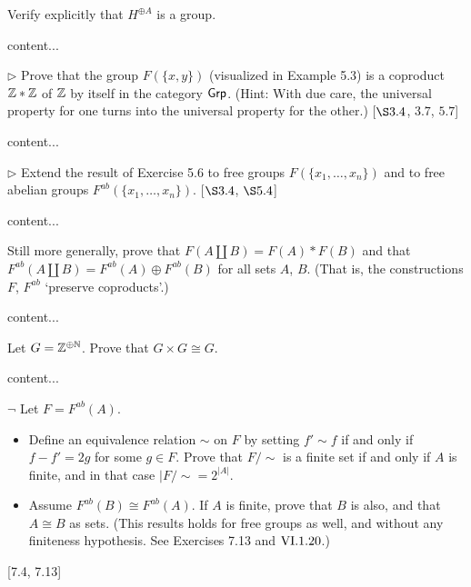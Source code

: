 \begin{exercise}
	Verify explicitly that $H^{\oplus A}$ is a group. 
\end{exercise}
\begin{solution}
	content...
\end{solution}

\begin{exercise}
	$\triangleright$ Prove that the group $F(\{x,y\})$ (visualized in Example 5.3) is a coproduct $\mathbb{Z}\ast \mathbb{Z}$ of $\mathbb{Z}$ by itself in the category $\textsf{Grp}$. (Hint: With due care, the universal property for one turns into the universal property for the other.) [$\S 3.4$, $3.7$, $5.7$]
\end{exercise}
\begin{solution}
	content...
\end{solution}

\begin{exercise}
	$\triangleright$ Extend the result of Exercise 5.6 to free groups $F(\{x_1,\ldots, x_n\})$ and to free abelian groups $F^{ab}(\{x_1,\ldots,x_n\})$. [$\S 3.4$, $\S 5.4$]
\end{exercise}
\begin{solution}
	content...
\end{solution}

\begin{exercise}
	Still more generally, prove that $F(A \amalg B) = F(A) \ast F(B)$ and that $F^{ab}(A\amalg B) = F^{ab}(A)\oplus F^{ab}(B)$ for all sets $A$, $B$. (That is, the constructions $F$, $F^{ab}$ `preserve coproducts'.) 
\end{exercise}
\begin{solution}
	content...
\end{solution}

\begin{exercise}
	Let $G = \mathbb{Z}^{\oplus\mathbb{N}}$. Prove that $G\times G \cong G$.
\end{exercise}
\begin{solution}
	content...
\end{solution}

\begin{exercise}
	$\neg$ Let $F = F^{ab}(A)$.
	\begin{itemize}[leftmargin=16pt]%
		\item Define an equivalence relation $\sim$ on $F$ by setting $f'\sim f$ if and only if $f-f' = 2g$ for some $g\in F$. Prove that $F/{\sim}$ is a finite set if and only if $A$ is finite, and in that case $|F/{\sim} = 2^{|A|}$.
		\item Assume $F^{ab}(B) \cong F^{ab}(A)$. If $A$ is finite, prove that $B$ is also, and that $A \cong B$ as sets. (This results holds for free groups as well, and without any finiteness hypothesis. See Exercises 7.13 and $\RNo{6}.1.20$.)
	\end{itemize}
	[7.4, 7.13]
\end{exercise}